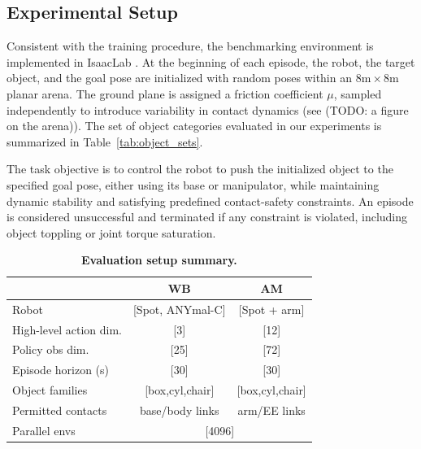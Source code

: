 

\subsection{Experimental Setup}
\label{subsec:exp_setup}

Consistent with the training procedure, the benchmarking environment is implemented in IsaacLab \cite{Baginski2025IsaacLab}. At the beginning of each episode, the robot, the target object, and the goal pose are initialized with random poses within an $8\mathrm{m} \times 8\mathrm{m}$ planar arena. The ground plane is assigned a friction coefficient $\mu$, sampled independently to introduce variability in contact dynamics (see (TODO: a figure on the arena)). The set of object categories evaluated in our experiments is summarized in Table~\ref{tab:object_sets}.

The task objective is to control the robot to push the initialized object to the specified goal pose, either using its base or manipulator, while maintaining dynamic stability and satisfying predefined contact-safety constraints. An episode is considered unsuccessful and terminated if any constraint is violated, including object toppling or joint torque saturation. 

\begin{table}[t]
\centering
\caption{\textbf{Evaluation setup summary.}}
\label{tab:setup_summary}
\small
\setlength{\tabcolsep}{4pt}
\renewcommand{\arraystretch}{1.05}
\begin{tabular}{@{}p{2.9cm}cc@{}}
\toprule
 & \textbf{WB} & \textbf{AM} \\
\midrule
Robot & [Spot, ANYmal-C]  & [Spot + arm] \\
High-level action dim. & [3] & [12] \\
Policy obs dim. & [25] & [72] \\
Episode horizon (s) & [30] & [30] \\
Object families & [box,cyl,chair] & [box,cyl,chair] \\
Permitted contacts & base/body links & arm/EE links \\
Parallel envs & \multicolumn{2}{c}{[4096]} \\
\bottomrule
\end{tabular}
\vspace{-0.75em}
\end{table}

